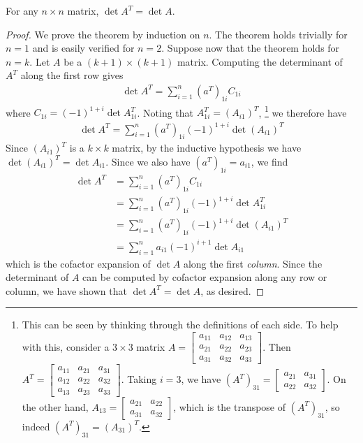 \documentclass[12pt,letterpaper,reqno]{article}
\numberwithin{equation}{section}
\begin{document}
\begin{thm}\label{thm:determinant_of_a_transpose}
	For any $n \times n$ matrix, $\det A^T=\det A$.
\end{thm}

\begin{proof}
We prove the theorem by induction on $n$. The theorem holds trivially for $n=1$ and is easily verified for $n=2$. Suppose now that the theorem holds for $n=k$. Let $A$ be a $(k+1) \times (k+1)$ matrix. Computing the determinant of $A^T$ along the first row gives
\begin{align*}
	\det A^T=\sum_{i=1}^n(a^T)_{1i}C_{1i}
\end{align*}
where $C_{1i}=(-1)^{1+i}\det A^T_{1i}$. Noting that $A^T_{1i}=(A_{i1})^T$, \footnote{This can be seen by thinking through the definitions of each side. To help with this, consider a $3 \times 3$ matrix $A=\begin{bmatrix}
	a_{11} & a_{12} & a_{13} \\
	a_{21} & a_{22} & a_{23} \\
	a_{31} & a_{32} & a_{33}
\end{bmatrix}$. Then $A^T=\begin{bmatrix}
	a_{11} & a_{21} & a_{31} \\
	a_{12} & a_{22} & a_{32} \\
	a_{13} & a_{23} & a_{33}
\end{bmatrix}$. Taking $i=3$, we have $(A^T)_{31}=\begin{bmatrix}
	a_{21} & a_{31} \\
	a_{22} & a_{32}
\end{bmatrix}$. On the other hand, $A_{13}=\begin{bmatrix}
	a_{21} & a_{22} \\
	a_{31} & a_{32}
\end{bmatrix}$, which is the transpose of $(A^T)_{31}$, so indeed $(A^T)_{31}=(A_{31})^T$.} we therefore have
\begin{align*}
	\det A^T=\sum_{i=1}^n(a^T)_{1i}(-1)^{1+i}\det (A_{i1})^T
\end{align*} 
Since $(A_{i1})^T$ is a $k \times k$ matrix, by the inductive hypothesis we have $\det (A_{i1})^T= \det A_{i1}$. Since we also have $(a^T)_{1i}=a_{i1}$, we find
\begin{align*}
	\det A^T&=\sum_{i=1}^n(a^T)_{1i}C_{1i} \\
	&=\sum_{i=1}^n(a^T)_{1i}(-1)^{1+i}\det A^T_{1i} \\
	&=\sum_{i=1}^n(a^T)_{1i}(-1)^{1+i}\det (A_{i1})^T \\
	&=\sum_{i=1}^na_{i1}(-1)^{i+1}\det A_{i1}
\end{align*} 
which is the cofactor expansion of $\det A$ along the first \emph{column}. Since the determinant of $A$ can be computed by cofactor expansion along any row or column, we have shown that $\det A^T=\det A$, as desired. 
\end{proof}
\end{document}
